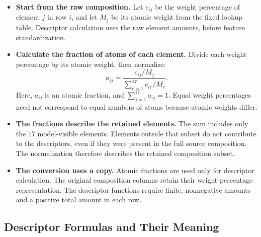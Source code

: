 \documentclass[11pt]{article}
\newenvironment{notes}
  {\begin{itemize}\setlength{\itemsep}{0.45em}\setlength{\parsep}{0pt}}
  {\end{itemize}}
\begin{document}
\begin{notes}
    \item \textbf{Start from the raw composition.}
    Let \(c_{ij}\) be the weight percentage of element
    \(j\) in row \(i\), and let \(M_j\) be its atomic weight
    from the fixed lookup table.
    Descriptor calculation uses the raw element amounts,
    before feature standardization.

    \item \textbf{Calculate the fraction of atoms of each element.}
    Divide each weight percentage by its atomic weight,
    then normalize:
    \begin{equation}
        a_{ij}
        =
        \frac{c_{ij}/M_j}
             {\displaystyle\sum_{e=1}^{17}c_{ie}/M_e}.
        \label{eq:magpie-atomic-fractions}
    \end{equation}
    Here, \(a_{ij}\) is an atomic fraction, and
    \(\sum_{j=1}^{17}a_{ij}=1\).
    Equal weight percentages need not correspond to equal
    numbers of atoms because atomic weights differ.

    \item \textbf{The fractions describe the retained elements.}
    The sum includes only the \(17\) model-visible elements.
    Elements outside that subset do not contribute to the
    descriptors, even if they were present in the full
    source composition.
    The normalization therefore describes the retained
    composition subset.

    \item \textbf{The conversion uses a copy.}
    Atomic fractions are used only for descriptor calculation.
    The original composition columns retain their
    weight-percentage representation.
    The descriptor functions require finite, nonnegative
    amounts and a positive total amount in each row.
\end{notes}

\subsection{Descriptor Formulas and Their Meaning}
\label{sec:magpie-statistics}
\end{document}
